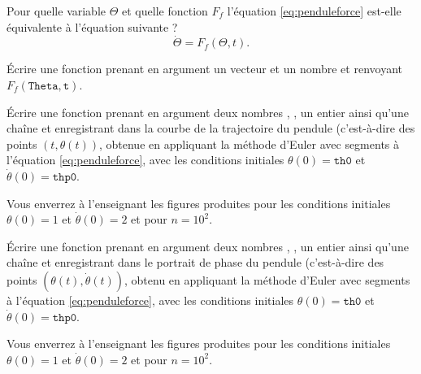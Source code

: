 \question{} Pour quelle variable $\Theta$ et quelle fonction $F_f$ l'équation  \eqref{eq:penduleforce} est-elle équivalente à l'équation suivante ? 
\begin{equation*}
  \dot{\Theta} = F_f(\Theta, t).
\end{equation*}

\question{} \'Ecrire une fonction  prenant en argument un vecteur  et un nombre  et renvoyant $F_f(\texttt{Theta},\texttt{t})$.


\medskip{}

\question{} \label{qu:trace_trajectoire_f} Écrire une fonction  prenant en argument deux nombres , , un entier  ainsi qu'une chaîne  et enregistrant dans  la courbe de la trajectoire du pendule (c'est-à-dire des points $(t,\theta(t))$, obtenue en appliquant la méthode d'Euler avec  segments à l'équation \eqref{eq:penduleforce}, avec les conditions initiales  $ \theta(0) = \texttt{th0}$ et $\dot{\theta}(0) = \texttt{thp0}$.

Vous enverrez à l'enseignant les figures produites pour les conditions initiales $\theta(0) = 1$ et $\dot{\theta}(0) = 2$ et pour $n=10^2$. 

\medskip{}

\question{} \label{qu:trace_phase_f} Écrire une fonction  prenant en argument deux nombres , , un entier  ainsi qu'une chaîne  et enregistrant dans  le portrait de phase du pendule (c'est-à-dire des points $(\theta(t),\dot{\theta}(t))$, obtenu en appliquant la méthode d'Euler avec  segments à l'équation \eqref{eq:penduleforce}, avec les conditions initiales  $ \theta(0) = \texttt{th0}$ et $\dot{\theta}(0) = \texttt{thp0}$.

Vous enverrez à l'enseignant les figures produites pour les conditions initiales $\theta(0) = 1$ et $\dot{\theta}(0) = 2$ et pour $n=10^2$. 


